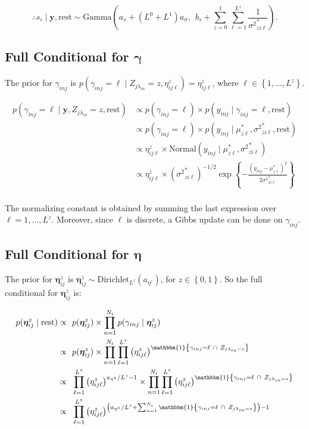 \documentclass[12pt,]{article}
\newcommand{\p}[1]{\left(#1\right)}
\newcommand{\bc}[1]{ \left\{#1\right\} }
\newcommand{\N}{ \mathcal{N} }
\def\N{\text{Normal}}
\def\G{\text{Gamma}}
\def\Dir{\text{Dirichlet}}
\def\lin{\lambda_{in}}
\def\y{\bm{y}}
\def\mus{\mu^*}
\def\sss{{\sigma^2}^*}
\newcommand{\Ind}[1]{\mathbbm{1}\bc{#1}}
\def\rest{\text{rest}}
\begin{document}
\[
\therefore s_i \mid \y, \rest \sim 
\G\p{a_s + (L^0 + L^1)a_\sigma, ~~ b_s + \sum_{z=0}^1 \sum_{\ell=1}^{L^z} \frac{1}{\sss_{zi\ell}} }.
\]

\subsection{\texorpdfstring{Full Conditional for
\(\bm\gamma\)}{Full Conditional for \textbackslash{}bm\textbackslash{}gamma}}\label{full-conditional-for-bmgamma}

The prior for \(\gamma_{inj}\) is
\(p(\gamma_{inj} = \ell \mid Z_{j\lin}=z, \eta^z_{ij\ell}) = \eta^z_{ij\ell}\),
where \(\ell \in \bc{1,...,L^z}\).

\begin{align*}
p(\gamma_{inj}=\ell \mid \y, Z_{j\lin}=z, \rest) &\propto p(\gamma_{inj}=\ell) \times p(y_{inj} \mid \gamma_{inj}=\ell, \rest) \\
&\propto p(\gamma_{inj}=\ell) \times p(y_{inj} \mid \mus_{z\ell}, \sss_{zi\ell}, \rest) \\
%
&\propto \eta^z_{ij\ell} \times \N(y_{inj} \mid \mus_{z\ell}, \sss_{zi\ell}) \\
&\propto \eta^z_{ij\ell} \times (\sss_{zi\ell})^{-1/2}
\exp\bc{-\frac{(y_{inj} - \mus_{z\ell})^2}{2\sss_{zi\ell}}} \\
\end{align*}

The normalizing constant is obtained by summing the last expression over
\(\ell = 1,...,L^z\). Moreover, since \(\ell\) is discrete, a Gibbs
update can be done on \(\gamma_{inj}\).

\subsection{\texorpdfstring{Full Conditional for
\(\bm\eta\)}{Full Conditional for \textbackslash{}bm\textbackslash{}eta}}\label{full-conditional-for-bmeta}

The prior for \(\bm\eta^z_{ij}\) is
\(\bm \eta^z_{ij} \sim \Dir_{L^z}(a_{\eta^z})\), for \(z\in\bc{0,1}\).
So the full conditional for \(\bm\eta^z_{ij}\) is:

\begin{align*}
p(\bm \eta^z_{ij} \mid \rest) \propto&~~ p(\bm{\eta}^z_{ij}) \times \prod_{n=1}^{N_i} p(\gamma_{inj} \mid \bm \eta^z_{ij})\\
\propto&~~ p(\bm \eta^z_{ij}) \times \prod_{n=1}^{N_i}\prod_{\ell=1}^{L^z} \p{\eta^z_{ij\ell}}^{\Ind{ \gamma_{inj}=\ell ~\cap~ Z_{j\lin=z}}}\\
%
\propto&~~ \prod_{\ell=1}^{L^z} \p{\eta^z_{ij\ell}}^{a_{\eta^z}/L^z-1} \times 
\prod_{n=1}^{N_i}\prod_{\ell=1}^{L^z} \p{\eta^z_{ij\ell}}^{\Ind{ \gamma_{inj}=\ell ~\cap~ Z_{j\lin=z}}}\\
\propto&~~ \prod_{\ell=1}^{L^z} \p{\eta^z_{ij\ell}}^{\p{a_{\eta^z} / L^z + \sum_{n=1}^{N_i} \Ind{ \gamma_{inj}=\ell ~\cap~ Z_{j\lin=z}}} - 1}\\
%
\end{align*}
\end{document}
